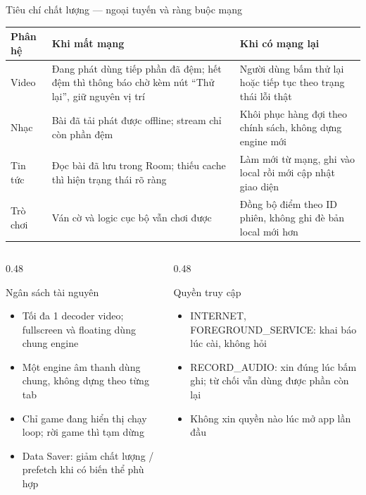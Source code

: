 \begin{frame}{Tiêu chí chất lượng --- ngoại tuyến và ràng buộc mạng}
\begin{center}
{\tiny
\begin{tabular}{@{}p{1.2cm}p{5.7cm}p{5.7cm}@{}}
\toprule
\textbf{Phân hệ} & \textbf{Khi mất mạng} & \textbf{Khi có mạng lại} \\
\midrule
Video & Đang phát dùng tiếp phần đã đệm; hết đệm thì thông báo chờ kèm nút ``Thử lại'', giữ nguyên vị trí & Người dùng bấm thử lại hoặc tiếp tục theo trạng thái lỗi thật \\
Nhạc & Bài đã tải phát được offline; stream chỉ còn phần đệm & Khôi phục hàng đợi theo chính sách, không dựng engine mới \\
Tin tức & Đọc bài đã lưu trong Room; thiếu cache thì hiện trạng thái rõ ràng & Làm mới từ mạng, ghi vào local rồi mới cập nhật giao diện \\
Trò chơi & Ván cờ và logic cục bộ vẫn chơi được & Đồng bộ điểm theo ID phiên, không ghi đè bản local mới hơn \\
\bottomrule
\end{tabular}}
\end{center}
\vspace{1mm}
\begin{columns}[T]
\begin{column}{0.48\textwidth}
\begin{exampleblock}{\scriptsize Ngân sách tài nguyên}
{\tiny
\begin{itemize}\setlength{\itemsep}{1pt}
\item Tối đa 1 decoder video; fullscreen và floating dùng chung engine
\item Một engine âm thanh dùng chung, không dựng theo từng tab
\item Chỉ game đang hiển thị chạy loop; rời game thì tạm dừng
\item Data Saver: giảm chất lượng / prefetch khi có biến thể phù hợp
\end{itemize}}
\end{exampleblock}
\end{column}
\begin{column}{0.48\textwidth}
\begin{exampleblock}{\scriptsize Quyền truy cập}
{\tiny
\begin{itemize}\setlength{\itemsep}{1pt}
\item INTERNET, FOREGROUND\_SERVICE: khai báo lúc cài, không hỏi
\item RECORD\_AUDIO: xin đúng lúc bấm ghi; từ chối vẫn dùng được phần còn lại
\item Không xin quyền nào lúc mở app lần đầu
\end{itemize}}
\end{exampleblock}
\end{column}
\end{columns}
\end{frame}

